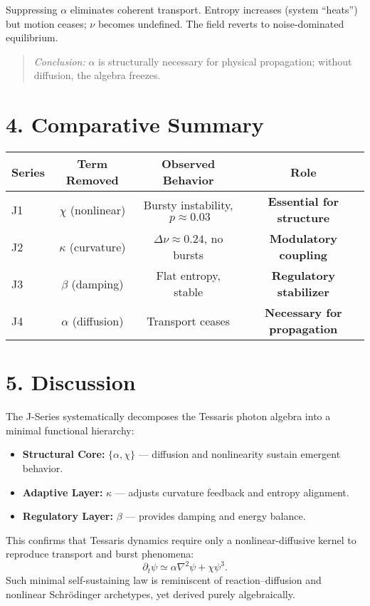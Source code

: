 \documentclass[12pt]{article}
\begin{document}
Suppressing $\alpha$ eliminates coherent transport.
Entropy increases (system “heats”) but motion ceases; $\nu$ becomes undefined.
The field reverts to noise-dominated equilibrium.

\begin{quote}
\emph{Conclusion:}
$\alpha$ is structurally necessary for physical propagation; without diffusion, the algebra freezes.
\end{quote}

\section*{4. Comparative Summary}
\begin{center}
\begin{tabular}{lccc}
\toprule
\textbf{Series} & \textbf{Term Removed} & \textbf{Observed Behavior} & \textbf{Role}\\
\midrule
J1 & $\chi$ (nonlinear) & Bursty instability, $\;p\!\approx\!0.03$ & \textbf{Essential for structure}\\
J2 & $\kappa$ (curvature) & $\Delta\nu\!\approx\!0.24$, no bursts & \textbf{Modulatory coupling}\\
J3 & $\beta$ (damping) & Flat entropy, stable & \textbf{Regulatory stabilizer}\\
J4 & $\alpha$ (diffusion) & Transport ceases & \textbf{Necessary for propagation}\\
\bottomrule
\end{tabular}
\end{center}

\section*{5. Discussion}

The J-Series systematically decomposes the Tessaris photon algebra into a minimal functional hierarchy:

\begin{itemize}
  \item \textbf{Structural Core:} $\{\alpha, \chi\}$ — diffusion and nonlinearity sustain emergent behavior.
  \item \textbf{Adaptive Layer:} $\kappa$ — adjusts curvature feedback and entropy alignment.
  \item \textbf{Regulatory Layer:} $\beta$ — provides damping and energy balance.
\end{itemize}

This confirms that Tessaris dynamics require only a nonlinear-diffusive kernel to reproduce transport and burst phenomena:
\[
\partial_t \psi \simeq \alpha \nabla^2 \psi + \chi \psi^3.
\]
Such minimal self-sustaining law is reminiscent of reaction–diffusion and nonlinear Schrödinger archetypes, yet derived purely algebraically.
\end{document}
